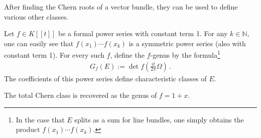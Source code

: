 
    After finding the Chern roots of a vector bundle, they can be used to define various other classes.
    \begin{construct}[Genus]
        Let $f\in K[[t]]$ be a formal power series with constant term 1. For any $k\in\mathbb{N}$, one can easily see that $f(x_1)\cdots f(x_k)$ is a symmetric power series (also with constant term 1). For every such $f$, define the $f$-genus by the formula\footnote{In the case that $E$ splits as a sum for line bundles, one simply obtains the product $f(x_1)\cdots f(x_k)$.}
        \begin{gather}
            G_f(E) := \det f\left(\frac{it}{2\pi}\Omega\right)\,.
        \end{gather}
        The coefficients of this power series define characteristic classes of $E$.
    \end{construct}

    \begin{example}
        The total Chern class is recovered as the genus of $f=1+x$.
    \end{example}

